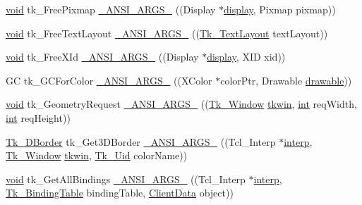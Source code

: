 \begin{DoxyCompactItemize}
\item 
\hyperlink{tk_8h_aba408b7cd755a96426e004c015f5de8e}{void} tk\+\_\+\+Free\+Pixmap \hyperlink{struct_tk_stubs_a1e1b89d84709e029f6056ef9a1ffdf37}{\+\_\+\+A\+N\+S\+I\+\_\+\+A\+R\+G\+S\+\_\+} ((Display $\ast$\hyperlink{tk_8h_afc08b650bd5c7e58f8133cc830a2ef84}{display}, Pixmap pixmap))
\item 
\hyperlink{tk_8h_aba408b7cd755a96426e004c015f5de8e}{void} tk\+\_\+\+Free\+Text\+Layout \hyperlink{struct_tk_stubs_a0fa300b5a94d58a3b47d2f123315ef4b}{\+\_\+\+A\+N\+S\+I\+\_\+\+A\+R\+G\+S\+\_\+} ((\hyperlink{tk_8h_aac15dd7e96fec9e6c8255fd454d4d617}{Tk\+\_\+\+Text\+Layout} text\+Layout))
\item 
\hyperlink{tk_8h_aba408b7cd755a96426e004c015f5de8e}{void} tk\+\_\+\+Free\+X\+Id \hyperlink{struct_tk_stubs_adb656df20d856f49baefc84d21e27919}{\+\_\+\+A\+N\+S\+I\+\_\+\+A\+R\+G\+S\+\_\+} ((Display $\ast$\hyperlink{tk_8h_afc08b650bd5c7e58f8133cc830a2ef84}{display}, X\+ID xid))
\item 
GC tk\+\_\+\+G\+C\+For\+Color \hyperlink{struct_tk_stubs_a22103be45b78df4cacbfbdcdcc465316}{\+\_\+\+A\+N\+S\+I\+\_\+\+A\+R\+G\+S\+\_\+} ((X\+Color $\ast$color\+Ptr, Drawable \hyperlink{tk_8h_aa51f8466cbc86ba8ba27b8e32a0361c7}{drawable}))
\item 
\hyperlink{tk_8h_aba408b7cd755a96426e004c015f5de8e}{void} tk\+\_\+\+Geometry\+Request \hyperlink{struct_tk_stubs_adddcb0195805cf3c5b9f2341bb68dc1d}{\+\_\+\+A\+N\+S\+I\+\_\+\+A\+R\+G\+S\+\_\+} ((\hyperlink{tk_8h_ab756137de3ee74edc2501bd0d761e37c}{Tk\+\_\+\+Window} \hyperlink{tk_8h_a35df722e7e1b6efd651683b8be7c1490}{tkwin}, \hyperlink{tk_8h_a83f82f76e7fed06f4c49d2db94028a6d}{int} req\+Width, \hyperlink{tk_8h_a83f82f76e7fed06f4c49d2db94028a6d}{int} req\+Height))
\item 
\hyperlink{tk_8h_a7691523098431859a6f7514f1422e545}{Tk\+\_\+D\+Border} tk\+\_\+\+Get3\+D\+Border \hyperlink{struct_tk_stubs_a2227763b1b429dd74b207a0cb0c3beaf}{\+\_\+\+A\+N\+S\+I\+\_\+\+A\+R\+G\+S\+\_\+} ((Tcl\+\_\+\+Interp $\ast$\hyperlink{tk_8h_a5ab79c0f5849ee8e6a2e955a6c536cc0}{interp}, \hyperlink{tk_8h_ab756137de3ee74edc2501bd0d761e37c}{Tk\+\_\+\+Window} \hyperlink{tk_8h_a35df722e7e1b6efd651683b8be7c1490}{tkwin}, \hyperlink{tk_8h_aab6f7e0c4f113c8e02feee260e7c4414}{Tk\+\_\+\+Uid} color\+Name))
\item 
\hyperlink{tk_8h_aba408b7cd755a96426e004c015f5de8e}{void} tk\+\_\+\+Get\+All\+Bindings \hyperlink{struct_tk_stubs_a0149b97622d8811173a6db98ceb41fa4}{\+\_\+\+A\+N\+S\+I\+\_\+\+A\+R\+G\+S\+\_\+} ((Tcl\+\_\+\+Interp $\ast$\hyperlink{tk_8h_a5ab79c0f5849ee8e6a2e955a6c536cc0}{interp}, \hyperlink{tk_8h_aba3b4bb6109d20b6e4bf79b230f23566}{Tk\+\_\+\+Binding\+Table} binding\+Table, \hyperlink{tk_8h_accf84b4d725a8f41e04d6333768a6001}{Client\+Data} object))

\end{DoxyCompactItemize}
